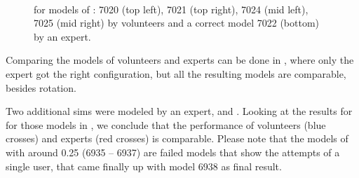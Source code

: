 \begin{figure}
  \centering
   \\
  \caption{\kenc for models of : 7020 (top left), 7021 (top right), 7024 (mid left), 7025 (mid right) by volunteers and a correct model 7022 (bottom) by an expert.}
  \label{fig:kapenc_compare_faulty}
\end{figure}

Comparing the models of volunteers and experts can be done in , where only the
expert got the right configuration, but all the resulting models are comparable, besides rotation.

Two additional sims were modeled by an expert,  and .
Looking at the results for \gEr for those models in , we conclude that the performance of volunteers (blue crosses) and experts (red crosses) is comparable.
Please note that the models of  with  around 0.25 (6935 -- 6937) are failed models that show the attempts of a single user, that came finally up with model 6938 as final result.

\clearpage
